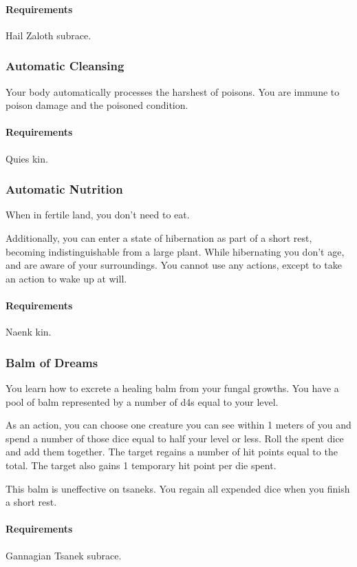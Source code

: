     \paragraph{Requirements} Hail Zaloth subrace.
\subsubsection{Automatic Cleansing} \label{feat::automaticcleansing}
    Your body automatically processes the harshest of poisons.
    You are immune to poison damage and the poisoned condition.
    \paragraph{Requirements} Quies kin.
\subsubsection{Automatic Nutrition} \label{feat::automaticnutrition}
    When in fertile land, you don't need to eat.

    Additionally, you can enter a state of hibernation as part of a short rest, becoming indistinguishable from a large plant.
    While hibernating you don't age, and are aware of your surroundings.
    You cannot use any actions, except to take an action to wake up at will.
    \paragraph{Requirements} Naenk kin.
\subsubsection{Balm of Dreams} \label{feat::balmofdreams}
    You learn how to excrete a healing balm from your fungal growths.
    You have a pool of balm represented by a number of d4s equal to your level.

    As an action, you can choose one creature you can see within 1 meters of you and spend a number of those dice equal to half your level or less.
    Roll the spent dice and add them together.
    The target regains a number of hit points equal to the total.
    The target also gains 1 temporary hit point per die spent.

    This balm is uneffective on tsaneks.
    You regain all expended dice when you finish a short rest.
    \paragraph{Requirements} Gannagian Tsanek subrace.
